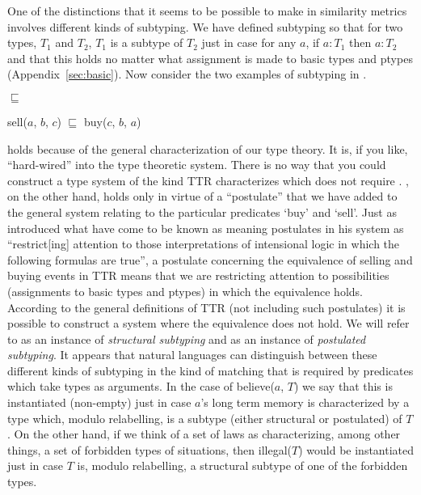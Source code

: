 One of the distinctions that it seems to be possible to make in
similarity metrics involves different kinds of subtyping.  We
have defined subtyping so that for two types, $T_1$ and $T_2$, $T_1$
is a subtype of $T_2$ just in case for any $a$, if $a:T_1$ then
$a:T_2$ and that this holds no matter what assignment is made to basic
types and ptypes (Appendix~\ref{sec:basic}).  Now consider the two
examples of subtyping in \nexteg{}.
\begin{ex} 
\begin{subex} 
 
\item {} $\sqsubseteq$ 
 
\item sell($a$, $b$, $c$) $\sqsubseteq$ buy($c$, $b$, $a$) 
 
\end{subex} 
   
\end{ex} 
 holds because of the general characterization of our type
theory.  It is, if you like, ``hard-wired'' into the type theoretic
system.  There is no way that you could construct a type system of the
kind TTR characterizes which does not require .  ,
on the other hand,  holds only in virtue of a ``postulate'' that we
have added to the general system relating to the particular predicates
`buy' and `sell'.  Just as \cite{Montague1973} introduced what have
come to be known as meaning postulates in his system as
``restrict[ing] attention to those interpretations of intensional
logic in which the following formulas are true'', a postulate
concerning the equivalence of selling and buying events in TTR means
that we are restricting attention to possibilities (assignments to
basic types and ptypes) in which the equivalence holds.  According to
the general definitions of TTR (not including such postulates) it is
possible to construct a system where the equivalence does not hold.
We will refer to  as an instance of \textit{structural
  subtyping} and  as an instance of \textit{postulated
  subtyping}.  It appears that natural languages can distinguish
between these different kinds of subtyping in the kind of matching
that is required by predicates which take types as arguments.  In the
case of believe($a$, $T$) we say that this is instantiated (non-empty)
just in case $a$'s long term memory is characterized by a type which,
modulo relabelling,
is a subtype (either structural or postulated) of $T$.  On the other
hand, if we think of a set of laws as characterizing, among other
things, a set of forbidden types of situations, then illegal($T$)
would be instantiated just in case $T$ is, modulo relabelling, a structural subtype of one of the
forbidden types. 

